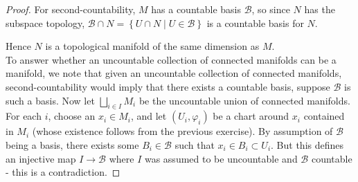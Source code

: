 \documentclass[reqno]{amsart}
\theoremstyle{definition}
\theoremstyle{remark}
\begin{document}
\begin{proof}
For second-countability, $M$ has a countable basis
$\mathcal{B}$, so since $N$ has the subspace topology,
$\mathcal{B} \cap N = 
\left\{ U \cap N  \mid  U \in \mathcal{B} \right\} $ 
is a countable basis for $N$.

Hence $N$ is a topological manifold of the
same dimension as $M$.\\
\linebreak
To answer whether an uncountable collection of
connected manifolds can be a manifold, we note that
given an uncountable collection of connected manifolds, 
second-countability would imply that
there exists a countable basis, suppose
$\mathcal{B}$ is such a basis.
Now let $\bigsqcup_{i \in I} M_i$ be the uncountable union of
connected manifolds. For each $i$, choose
an $x_i \in M_i$, and let
$\left( U_i, \varphi_i \right) $ be a chart around
$x_i$ contained in $M_i$ (whose existence
follows from the previous exercise). By assumption
of $\mathcal{B}$ being a basis, there
exists some $B_i \in \mathcal{B}$ such that
$x_i \in B_i \subset U_i$. But this defines an
injective map
$I \to \mathcal{B}$ where $I$ was assumed to be uncountable
and $\mathcal{B}$ countable - this is a contradiction.

\end{proof}







\end{document}
